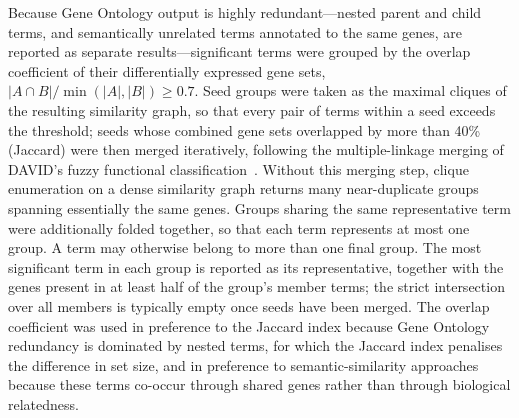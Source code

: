 Because Gene Ontology output is highly redundant---nested parent and child terms, and
semantically unrelated terms annotated to the same genes, are reported as separate
results---significant terms were grouped by the overlap coefficient of their
differentially expressed gene sets, $|A \cap B| / \min(|A|,|B|) \geq 0.7$. Seed groups were
taken as the maximal cliques of the resulting similarity graph, so that every pair of terms
within a seed exceeds the threshold; seeds whose combined gene sets overlapped by more than
40\% (Jaccard) were then merged iteratively, following the multiple-linkage merging of
DAVID's fuzzy functional classification~\cite{huang2009david,huang2007david}. Without this
merging step, clique enumeration on a dense similarity graph returns many near-duplicate
groups spanning essentially the same genes. Groups sharing the same representative term were
additionally folded together, so that each term represents at most one group. A term may
otherwise belong to more than one final group.
The most significant term in each group is reported as its representative, together with the
genes present in at least half of the group's member terms; the strict intersection over all
members is typically empty once seeds have been merged. The overlap coefficient was used in
preference to the Jaccard index because Gene Ontology redundancy is dominated by nested
terms, for which the Jaccard index penalises the difference in set size, and in preference
to semantic-similarity approaches because these terms co-occur through shared genes rather
than through biological relatedness.

